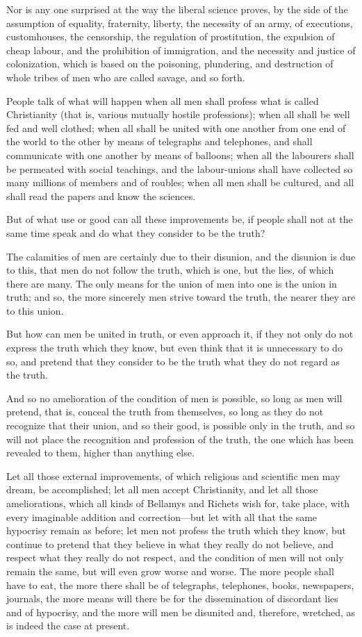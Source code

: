 \documentclass{book}
\begin{document}
Nor is any one surprised at the way the liberal science proves, by the side of the assumption of equality, fraternity, liberty, the necessity of an army, of executions, customhouses, the censorship, the regulation of prostitution, the expulsion of cheap labour, and the prohibition of immigration, and the necessity and justice of colonization, which is based on the poisoning, plundering, and destruction of whole tribes of men who are called savage, and so forth.

People talk of what will happen when all men shall profess what is called Christianity (that is, various mutually hostile professions); when all shall be well fed and well clothed; when all shall be united with one another from one end of the world to the other by means of telegraphs and telephones, and shall communicate with one another by means of balloons; when all the labourers shall be permeated with social teachings, and the labour-unions shall have collected so many millions of members and of roubles; when all men shall be cultured, and all shall read the papers and know the sciences.

But of what use or good can all these improvements be, if people shall not at the same time speak and do what they consider to be the truth?

The calamities of men are certainly due to their disunion, and the disunion is due to this, that men do not follow the truth, which is one, but the lies, of which there are many. The only means for the union of men into one is the union in truth; and so, the more sincerely men strive toward the truth, the nearer they are to this union.

But how can men be united in truth, or even approach it, if they not only do not express the truth which they know, but even think that it is unnecessary to do so, and pretend that they consider to be the truth what they do not regard as the truth.

And so no amelioration of the condition of men is possible, so long as men will pretend, that is, conceal the truth from themselves, so long as they do not recognize that their union, and so their good, is possible only in the truth, and so will not place the recognition and profession of the truth, the one which has been revealed to them, higher than anything else.

Let all those external improvements, of which religious and scientific men may dream, be accomplished; let all men accept Christianity, and let all those ameliorations, which all kinds of Bellamys and Richets wish for, take place, with every imaginable addition and correction—but let with all that the same hypocrisy remain as before; let men not profess the truth which they know, but continue to pretend that they believe in what they really do not believe, and respect what they really do not respect, and the condition of men will not only remain the same, but will even grow worse and worse. The more people shall have to eat, the more there shall be of telegraphs, telephones, books, newspapers, journals, the more means will there be for the dissemination of discordant lies and of hypocrisy, and the more will men be disunited and, therefore, wretched, as is indeed the case at present.
\end{document}
